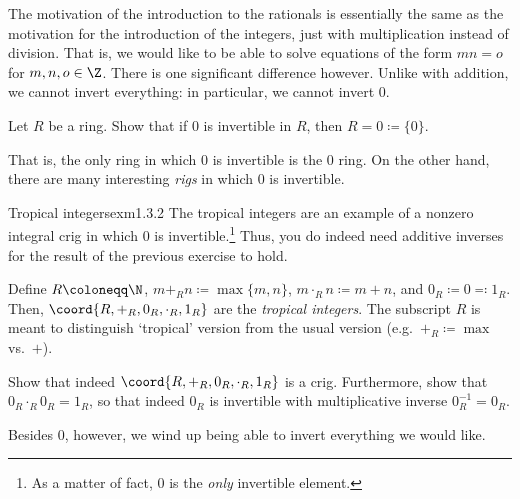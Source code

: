 The motivation of the introduction to the rationals is essentially the same as the motivation for the introduction of the integers, just with multiplication instead of division.  That is, we would like to be able to solve equations of the form $mn=o$ for $m,n,o\in \Z$.  There is one significant difference however.  Unlike with addition, we cannot invert everything:  in particular, we cannot invert $0$.
\begin{exr}{}{}
Let $R$ be a ring.  Show that if $0$ is invertible in $R$, then $R=0\coloneqq \{ 0\}$.
\end{exr}
That is, the only ring in which $0$ is invertible is the $0$ ring.  On the other hand, there are many interesting \emph{rigs} in which $0$ is invertible.
\begin{exm}{Tropical integers}{exm1.3.2}
The tropical integers are an example of a nonzero integral crig in which $0$ is invertible.\footnote{As a matter of fact, $0$ is the \emph{only} invertible element.}  Thus, you do indeed need additive inverses for the result of the previous exercise to hold.

Define $R\coloneqq \N$, $m+_Rn\coloneqq \max \{ m,n\}$, $m\cdot _Rn\coloneqq m+n$, and $0_R\coloneqq 0\eqqcolon 1_R$.  Then, $\coord{R,+_R,0_R,\cdot _R,1_R}$ are the \emph{tropical integers}.  The subscript $R$ is meant to distinguish `tropical' version from the usual version (e.g.~$+_R\coloneqq \max$ vs.~$+$).
\begin{exr}[breakable=false]{}{}
Show that indeed $\coord{R,+_R,0_R,\cdot _R,1_R}$ is a crig.  Furthermore, show that $0_R\cdot _R0_R=1_R$, so that indeed $0_R$ is invertible with multiplicative inverse $0_R^{-1}=0_R$.
\end{exr}
\end{exm}
Besides $0$, however, we wind up being able to invert everything we would like.
